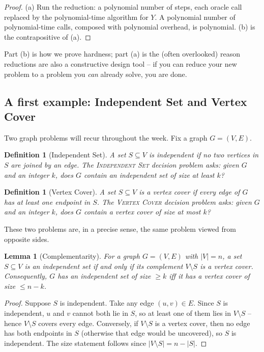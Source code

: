 \documentclass[11pt]{article}
\newtheorem{lemma}[theorem]{Lemma}
\newtheorem{definition}[theorem]{Definition}
\begin{document}
\begin{proof}
(a) Run the reduction: a polynomial number of steps, each oracle call replaced by the
polynomial-time algorithm for $Y$. A polynomial number of polynomial-time calls, composed
with polynomial overhead, is polynomial. (b) is the contrapositive of (a).
\end{proof}

Part (b) is how we prove hardness; part (a) is the (often overlooked) reason reductions are
also a constructive design tool -- if you can reduce your new problem to a problem you
\emph{can} already solve, you are done.

\subsection{A first example: Independent Set and Vertex Cover}

Two graph problems will recur throughout the week. Fix a graph $G = (V, E)$.

\begin{definition}[Independent Set]
A set $S \subseteq V$ is \emph{independent} if no two vertices in $S$ are joined by an
edge. The \textsc{Independent Set} decision problem asks: given $G$ and an integer $k$,
does $G$ contain an independent set of size at least $k$?
\end{definition}

\begin{definition}[Vertex Cover]
A set $S \subseteq V$ is a \emph{vertex cover} if every edge of $G$ has at least one
endpoint in $S$. The \textsc{Vertex Cover} decision problem asks: given $G$ and an integer
$k$, does $G$ contain a vertex cover of size at most $k$?
\end{definition}

These two problems are, in a precise sense, the same problem viewed from opposite sides.

\begin{lemma}[Complementarity]
\label{lem:is-vc}
For a graph $G = (V, E)$ with $|V| = n$, a set $S \subseteq V$ is an independent set
\emph{if and only if} its complement $V \setminus S$ is a vertex cover. Consequently, $G$
has an independent set of size $\ge k$ iff it has a vertex cover of size $\le n - k$.
\end{lemma}

\begin{proof}
Suppose $S$ is independent. Take any edge $(u, v) \in E$. Since $S$ is independent, $u$ and
$v$ cannot both lie in $S$, so at least one of them lies in $V \setminus S$ -- hence
$V \setminus S$ covers every edge. Conversely, if $V \setminus S$ is a vertex cover, then
no edge has both endpoints in $S$ (otherwise that edge would be uncovered), so $S$ is
independent. The size statement follows since $|V \setminus S| = n - |S|$.
\end{proof}
\end{document}
